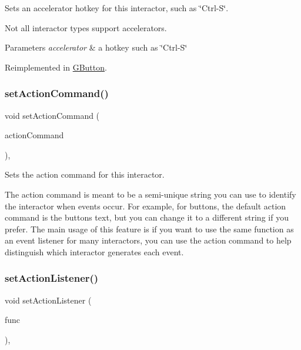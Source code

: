 Sets an accelerator hotkey for this interactor, such as \char`\"{}\+Ctrl-\/\+S\char`\"{}. 

Not all interactor types support accelerators. 
\begin{DoxyParams}{Parameters}
{\em accelerator} & a hotkey such as \char`\"{}\+Ctrl-\/\+S\char`\"{} \\
\hline
\end{DoxyParams}


Reimplemented in \mbox{\hyperlink{classsgl_1_1GButton_a502f311e78e7531f8a7b50054ce91c85}{G\+Button}}.

\mbox{\label{classsgl_1_1GInteractor_a4b5843fe3030e038a1ba54cc03389bcf}} 
\subsubsection{\texorpdfstring{set\+Action\+Command()}{setActionCommand()}}
{\footnotesize\ttfamily void set\+Action\+Command (\begin{DoxyParamCaption}\item[{const std\+::string \&}]{action\+Command }\end{DoxyParamCaption})\hspace{0.3cm}{\ttfamily [virtual]}, {\ttfamily [inherited]}}



Sets the action command for this interactor. 

The action command is meant to be a semi-\/unique string you can use to identify the interactor when events occur. For example, for buttons, the default action command is the button\textquotesingle{}s text, but you can change it to a different string if you prefer. The main usage of this feature is if you want to use the same function as an event listener for many interactors, you can use the action command to help distinguish which interactor generates each event. \mbox{\label{classsgl_1_1GInteractor_adcfb4742430c88714fcf57e57ab8ea9c}} 
\subsubsection{\texorpdfstring{set\+Action\+Listener()}{setActionListener()}\hspace{0.1cm}{\footnotesize\ttfamily [1/2]}}
{\footnotesize\ttfamily void set\+Action\+Listener (\begin{DoxyParamCaption}\item[{\mbox{\hyperlink{namespacesgl_ae9f3e9eab70035da1a2b114e21357b25}{G\+Event\+Listener}}}]{func }\end{DoxyParamCaption})\hspace{0.3cm}{\ttfamily [virtual]}, {\ttfamily [inherited]}}



